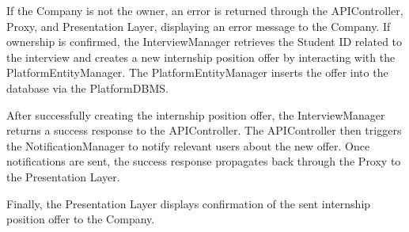 If the Company is not the owner, an error is returned through the APIController, Proxy, and Presentation Layer, displaying an error message to the Company. If ownership is confirmed, the InterviewManager retrieves the Student ID related to the interview and creates a new internship position offer by interacting with the PlatformEntityManager. The PlatformEntityManager inserts the offer into the database via the PlatformDBMS.

After successfully creating the internship position offer, the InterviewManager returns a success response to the APIController. The APIController then triggers the NotificationManager to notify relevant users about the new offer. Once notifications are sent, the success response propagates back through the Proxy to the Presentation Layer.

Finally, the Presentation Layer displays confirmation of the sent internship position offer to the Company.
